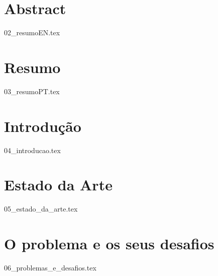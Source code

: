 \documentclass[
  oneside,
  11pt, a4paper,
  footinclude=true,
  headinclude=true,
  cleardoublepage=empty
]{scrbook}
\author{José Carlos Lima Martins}
\date{\myear} %
\begin{document}
    \umfrontcover{}
    \umtitlepage{}
	

	\chapter*{Abstract}
    {02_resumoEN.tex}
	
    \cleardoublepage{}
	\chapter*{Resumo}
    {03_resumoPT.tex}
	
	\tableofcontents
	\listoffigures
	\listoftables
	\lstlistoflistings
    \printglossary[]
    \printglossary[type=\acronymtype, title=Lista de Acrónimos]
	
	
	\chapter{Introdução}
    {04_introducao.tex}

	\chapter{Estado da Arte}
    {05_estado_da_arte.tex}

	\chapter{O problema e os seus desafios}
    {06_problemas_e_desafios.tex}

		
\end{document}
